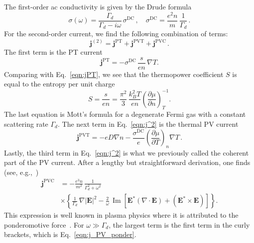 \documentclass[aps, prb, reprint, superscriptaddress]{revtex4-2}
\DeclareMathOperator{\im}{Im}
\renewcommand{\vec}{\mathbf}
\begin{document}
The first-order ac conductivity is given by the Drude formula
\begin{equation}
		\sigma(\omega) = \frac{\Gamma_d}{\Gamma_d - i \omega}\,  \sigma^\mathrm{DC}\,,
		\quad
		\sigma^{\mathrm{DC}} = \frac{e^2 n}{m}\, \frac{1}{\Gamma_d}\,.
		\label{eqn:sigma_AC}
	\end{equation}
For the second-order current, we find the following combination of terms:
\begin{equation}
	\vec{j}^{(2)} = \vec{j}^\mathrm{PT} + \vec{j}^\mathrm{PVT} + \vec{j}^\mathrm{PVC}\,.
	\label{eqn:j^2}
\end{equation}
The first term is the PT current
\begin{equation}
	\vec{j}^\mathrm{PT} = -\sigma^\mathrm{DC}\, \frac{s}{e n}\, \nabla T.
	\label{eqn:j_PT}
\end{equation}
Comparing with Eq.~\eqref{eqn:jPT}, we see that the thermopower coefficient $S$ is equal to the entropy per unit charge
\begin{equation}
	S = \frac{s}{e n} = \frac{\pi^2}{3}\, \frac{k_B^2 T}{e n}
	\left(\frac{\partial \mu}{\partial n}\right)_{T}^{-1} .
	\label{eqn:Mott}
\end{equation}
The last equation is Mott's formula for a degenerate Fermi gas with a constant scattering rate $\Gamma_d$.
The next term in Eq.~\eqref{eqn:j^2} is the thermal PV current
\begin{equation}
	\vec{j}^\mathrm{PVT} =  -e D \nabla n
	- \frac{\sigma^\mathrm{DC}}{e} \left(\frac{\partial \mu}{\partial T}\right)_n \nabla T\,.
	\label{eqn:j_PVT}
\end{equation}
Lastly, the third term  in Eq.~\eqref{eqn:j^2} is what we previously called the coherent part of the PV current.
After a lengthy but straightforward derivation, one finds  (see, e.g.,~\cite{Sun2018})
\begin{equation}
\begin{split}
	\vec{j}^\mathrm{PVC} &= -\frac{e^3 n}{m^2}\, \frac{1}{\Gamma_d^2 + \omega^2}
	\\
	&\times \left\{
	\frac{1}{\Gamma_d}\,  \nabla|\vec{E}|^2
	 - \frac{2}{\omega}\,
	  \im \left[\vec{E}^*\!\! \left(\nabla \cdot  \vec{E}\right)
	+  \left(\vec{E}^*\!\! \times  \vec{E}\right) \right]
	\right\} .
\end{split}
\label{eqn:j_PVC}
\end{equation}
This expression is well known in plasma physics where it is attributed to the ponderomotive force~\cite{Aliev1992}.
For $\omega\gg \Gamma_d$, the largest term is the first term in the curly brackets, which is Eq.~\eqref{eqn:j_PV_ponder}. 
\end{document}
